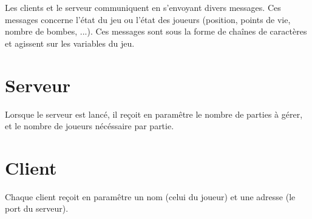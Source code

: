 	Les clients et le serveur communiquent en s'envoyant divers messages. Ces messages concerne l'état du jeu ou l'état des joueurs (position, points de vie, nombre de bombes, ...). Ces messages sont sous la forme de chaînes de caractères et agissent sur les variables du jeu.

\section*{Serveur}

Lorsque le serveur est lancé, il reçoit en paramêtre le nombre de parties à gérer, et le nombre de joueurs nécéssaire par partie. 

\section*{Client}

Chaque client reçoit en paramêtre un nom (celui du joueur) et une adresse (le port du serveur).
